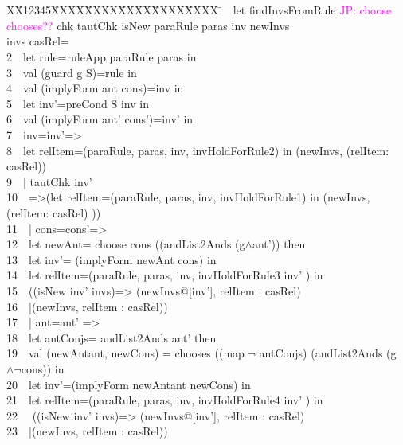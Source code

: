 \documentclass{llncs}
\newlength{\fminilength}
\newenvironment{fmini}[1][\linewidth]
  {\setlength{\fminilength}{#1\fboxsep-2\fboxrule}%
   \vspace{2ex}\noindent\begin{lrbox}{\fminibox}\begin{minipage}{\fminilength}%
   \mbox{ }\hfill\vspace{-2.5ex}}%
  {\end{minipage}\end{lrbox}\vspace{1ex}\hspace{0ex}%
   \framebox{\usebox{\fminibox}}}
\newenvironment{specification}
{\noindent\scriptsize
\tt\begin{fmini}\begin{tabbing}X\=X12345\=XXXX\=XXXX\=XXXX\=XXXX\=XXXX
\=\+\kill} {\end{tabbing}\normalfont\end{fmini}}
\def \twoSpaces {\ \ }
\newcommand\JP[1]{\textcolor{magenta}{JP: #1}}
\begin{document}
\begin{specification}
1\twoSpaces let findInvsFromRule \JP{choose chooses??} chk tautChk isNew paraRule paras inv newInvs\\ invs casRel=\\
2\twoSpaces     let rule=ruleApp paraRule paras in\\
3\twoSpaces   val (guard g  S)=rule in\\
4\twoSpaces   val (implyForm ant cons)=inv in\\


5\twoSpaces   let inv'=preCond S inv in\\
6\twoSpaces   val (implyForm ant' cons')=inv' in\\


7\twoSpaces     inv=inv'=>\\

8\twoSpaces         let relItem=(paraRule, paras, inv, invHoldForRule2) in
         (newInvs, (relItem: casRel))\\



9\twoSpaces      | tautChk inv'\\
10\twoSpaces         =>(let relItem=(paraRule, paras, inv, invHoldForRule1) in         (newInvs, (relItem: casRel)   ))\\


11\twoSpaces       | cons=cons'=>\\

12\twoSpaces       let newAnt=  choose cons ((andList2Ands (g$\wedge$ant'))     then\\

13\twoSpaces       let inv'= (implyForm newAnt cons) in\\


14\twoSpaces       let relItem=(paraRule, paras, inv,  invHoldForRule3 inv'   ) in\\

15\twoSpaces       ((isNew inv' invs)=>           (newInvs@[inv'], relItem : casRel)\\
16\twoSpaces       |(newInvs,  relItem : casRel))\\

17\twoSpaces     | ant=ant' =>\\
18\twoSpaces        let antConjs= andList2Ands ant'  then\\

19\twoSpaces        val (newAntant, newCons) = chooses ((map $\neg$ antConjs) (andList2Ands (g$\wedge \neg$cons)) in\\
20\twoSpaces        let inv'=(implyForm newAntant newCons) in\\
21\twoSpaces        let relItem=(paraRule, paras, inv,  invHoldForRule4 inv'   ) in\\
22 \twoSpaces       ((isNew inv' invs)=>         (newInvs@[inv'], relItem : casRel)\\
23\twoSpaces       |(newInvs,  relItem : casRel))\\


\end{specification}
\end{document}
